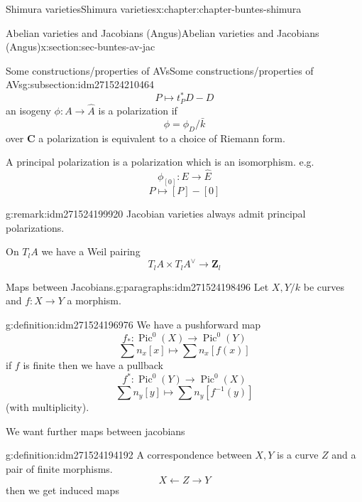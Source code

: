 \documentclass[oneside,10pt,]{book}
\numberwithin{equation}{section}
\newcommand{\inv}{^{-1}}
\newcommand{\ZZ}{\mathbf{Z}}
\newcommand{\CC}{\mathbf{C}}
\DeclareMathOperator{\Pic}{Pic}
\begin{document}
\begin{chapterptx}{Shimura varieties}{}{Shimura varieties}{}{}{x:chapter:chapter-buntes-shimura}
\begin{sectionptx}{Abelian varieties and Jacobians (Angus)}{}{Abelian varieties and Jacobians (Angus)}{}{}{x:section:sec-buntes-av-jac}
\begin{subsectionptx}{Some constructions\slash{}properties of AVs}{}{Some constructions\slash{}properties of AVs}{}{}{g:subsection:idm271524210464}
%
\begin{equation*}
P \mapsto t_P^* D -D
\end{equation*}
an isogeny \(\phi\colon A\to \hat A\) is a polarization if%
\begin{equation*}
\phi =  \phi_D /\bar k
\end{equation*}
over \(\CC\)  a polarization is equivalent to a choice of Riemann form.%
\par
A principal polarization is a polarization which is an isomorphism. e.g.%
\begin{equation*}
\phi_{[0]} \colon E \to \hat E
\end{equation*}
%
\begin{equation*}
P \mapsto [P] - [0]
\end{equation*}
%
\begin{remark}{}{g:remark:idm271524199920}%
Jacobian varieties always admit principal polarizations.%
\end{remark}
On \(T_lA \) we have  a Weil pairing%
\begin{equation*}
T_lA \times T_lA^\vee \to \ZZ_l
\end{equation*}
%
\begin{paragraphs}{Maps between Jacobians.}{g:paragraphs:idm271524198496}%
Let \(X,Y/k\) be curves and \(f\colon X \to Y\) a morphism.%
\begin{definition}{}{g:definition:idm271524196976}%
We have a pushforward map%
\begin{equation*}
f_*\colon \Pic^0(X) \to \Pic^0(Y)
\end{equation*}
%
\begin{equation*}
\sum n_x [x] \mapsto \sum n_x[f(x)]
\end{equation*}
if \(f\) is finite then we have  a pullback%
\begin{equation*}
f^* \colon \Pic^0(Y) \to \Pic^0(X)
\end{equation*}
%
\begin{equation*}
\sum n_y[y] \mapsto \sum n_y [f\inv (y)]
\end{equation*}
(with multiplicity).%
\end{definition}
We want further maps between jacobians%
\begin{definition}{}{g:definition:idm271524194192}%
A correspondence between \(X,Y\) is a curve \(Z\) and a pair of finite morphisms.%
\begin{equation*}
X \leftarrow Z \to Y
\end{equation*}
then we get induced maps%
\begin{equation*}

\end{equation*}
\end{definition}
\end{paragraphs}
\end{subsectionptx}
\end{sectionptx}
\end{chapterptx}
\end{document}
